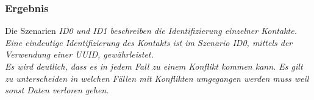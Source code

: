 \subsubsection*{Ergebnis}
Die Szenarien \it{ID0} und \it{ID1} beschreiben die Identifizierung einzelner Kontakte. Eine eindeutige Identifizierung des Kontakts ist im Szenario \it{ID0}, mittels der Verwendung einer \gls{UUID}, gewährleistet.\\
Es wird deutlich, dass es in jedem Fall zu einem Konflikt kommen kann. Es gilt zu unterscheiden in welchen Fällen mit Konflikten umgegangen werden muss weil sonst Daten verloren gehen.
